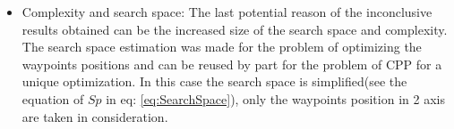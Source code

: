 \begin{itemize}
\begin{tabular}{l|p{1.3cm}p{1.3cm}p{1.3cm}p{1.3cm}p{1.3cm}p{1.3cm}}
\cellcolor[HTML]{F2F2FF}{$\sum_{i=1}^{n}Pc_i + \frac{\sum_{i=1}^{n}Pc_i}{(\frac{Distance}{N})\times 0.1}$}  &  \cellcolor[HTML]{F2F2FF}{57.78\%  426px}       & \cellcolor[HTML]{F2F2FF}{ 58.33\%  638px} & \cellcolor[HTML]{F2F2FF}{61.84\%   845px}& \cellcolor[HTML]{F2F2FF}{ 70.96\%  962px}& \cellcolor[HTML]{F2F2FF}{ 69.64\%  1099px}& \cellcolor[HTML]{F2F2FF}{ 82.50\%  1318px}\\ \hline
\end{tabular}
		\item Complexity and search space: 
		The last potential reason of the inconclusive results obtained can be the increased size of the search space and complexity. %
		The search space estimation was made for the problem of optimizing the waypoints positions and can be reused by part for the problem of CPP for a unique optimization. In this case the  search space is simplified(see the equation  of $Sp$ in eq: \ref{eq:SearchSpace}), only  the waypoints position in 2 axis are taken in consideration. %

\end{itemize}
